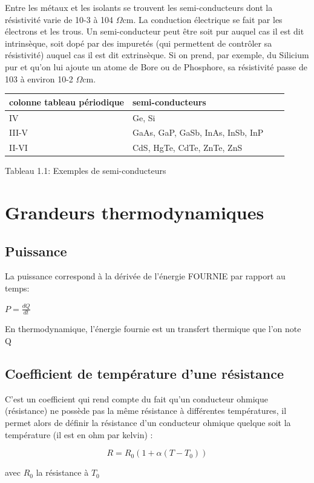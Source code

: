 \documentclass[10pt,a4paper]{report}
\begin{document}
Entre  les  métaux  et  les  isolants  se  trouvent  les  semi-conducteurs  dont  la  résistivité
varie de 10-3 à 104 $\Omega$cm. La conduction électrique se fait par les électrons et les trous. Un semi-conducteur peut être soit pur auquel cas il est dit intrinsèque, soit dopé par des impuretés (qui permettent de contrôler sa résistivité) auquel cas il est dit extrinsèque. Si on prend, par exemple, du Silicium pur  et  qu’on  lui  ajoute  un  atome  de  Bore  ou  de Phosphore,  sa résistivité passe de 103 à environ 10-2 $\Omega$cm.
\newline
\begin{center}
\begin{tabular}{|l|p{3cm}|c|p{3cm}|}\hline
colonne tableau périodique & semi-conducteurs\\\hline
IV & Ge, Si\\\hline
III-V & GaAs, GaP, GaSb, InAs, InSb, InP\\\hline
II-VI & CdS, HgTe, CdTe, ZnTe, ZnS \\\hline
\end{tabular}
\end{center}
\begin{center}
Tableau 1.1: Exemples de semi-conducteurs
\end{center}
\section{Grandeurs thermodynamiques}
\subsection{Puissance}
La puissance correspond à la dérivée de l'énergie FOURNIE par rapport au temps:
\newline
\begin{center}
{$P=\frac{dQ}{dt}$}
\end{center}
En thermodynamique, l’énergie fournie est un transfert thermique que l'on note Q
\subsection{Coefficient de température d'une résistance}
 C’est un coefficient qui rend compte du fait qu’un conducteur ohmique (résistance) ne possède pas la même résistance à différentes températures, il permet alors de définir la résistance d’un conducteur ohmique quelque soit la température (il est en ohm par kelvin) :
\newline
\begin{center}
\begin{equation}
R=R_{0}(1+\alpha(T-T_{0}))
\end{equation}
\end{center}
\begin{center}
avec $R_{0}$ la résistance à $T_{0}$
\end{center}
\end{document}
